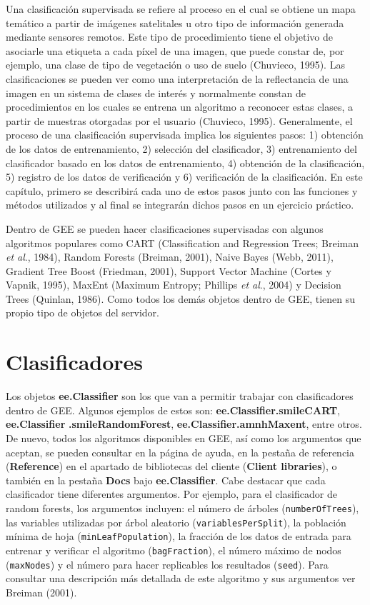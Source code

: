 \documentclass[
  12pt,
  letterpaper,
  twoside]{book}
\newcommand\boldpurple[1]{\textcolor{darkpurple}{\textbf{#1}}}
\begin{document}
Una clasificación supervisada se refiere al proceso en el cual se obtiene un mapa temático a partir de imágenes satelitales u otro tipo de información generada mediante sensores remotos. Este tipo de procedimiento tiene el objetivo de asociarle una etiqueta a cada píxel de una imagen, que puede constar de, por ejemplo, una clase de tipo de vegetación o uso de suelo (Chuvieco, 1995). Las clasificaciones se pueden ver como una interpretación de la reflectancia de una imagen en un sistema de clases de interés y normalmente constan de procedimientos en los cuales se entrena un algoritmo a reconocer estas clases, a partir de muestras otorgadas por el usuario (Chuvieco, 1995). Generalmente, el proceso de una clasificación supervisada implica los siguientes pasos: 1) obtención de los datos de entrenamiento, 2) selección del clasificador, 3) entrenamiento del clasificador basado en los datos de entrenamiento, 4) obtención de la clasificación, 5) registro de los datos de verificación y 6) verificación de la clasificación. En este capítulo, primero se describirá cada uno de estos pasos junto con las funciones y métodos utilizados y al final se integrarán dichos pasos en un ejercicio práctico.

Dentro de GEE se pueden hacer clasificaciones supervisadas con algunos algoritmos populares como CART (Classification and Regression Trees; Breiman \emph{et al}., 1984), Random Forests (Breiman, 2001), Naive Bayes (Webb, 2011), Gradient Tree Boost (Friedman, 2001), Support Vector Machine (Cortes y Vapnik, 1995), MaxEnt (Maximum Entropy; Phillips \emph{et al}., 2004) y Decision Trees (Quinlan, 1986). Como todos los demás objetos dentro de GEE, tienen su propio tipo de objetos del servidor.

\hypertarget{clasificadores}{%
\section{Clasificadores}\label{clasificadores}}

Los objetos \boldpurple{ee.Classifier} son los que van a permitir trabajar con clasificadores dentro de GEE. Algunos ejemplos de estos son: \boldpurple{ee.Classifier.smileCART}, \boldpurple{ee.Classifier} \boldpurple{.smileRandomForest}, \boldpurple{ee.Classifier.amnhMaxent}, entre otros. De nuevo, todos los algoritmos disponibles en GEE, así como los argumentos que aceptan, se pueden consultar en la página de ayuda, en la pestaña de referencia (\textbf{Reference}) en el apartado de bibliotecas del cliente (\textbf{Client libraries}), o también en la pestaña \textbf{Docs} bajo \boldpurple{ee.Classifier}. Cabe destacar que cada clasificador tiene diferentes argumentos. Por ejemplo, para el clasificador de random forests, los argumentos incluyen: el número de árboles (\texttt{numberOfTrees}), las variables utilizadas por árbol aleatorio (\texttt{variablesPerSplit}), la población mínima de hoja (\texttt{minLeafPopulation}), la fracción de los datos de entrada para entrenar y verificar el algoritmo (\texttt{bagFraction}), el número máximo de nodos (\texttt{maxNodes}) y el número para hacer replicables los resultados (\texttt{seed}). Para consultar una descripción más detallada de este algoritmo y sus argumentos ver Breiman (2001).
\end{document}
